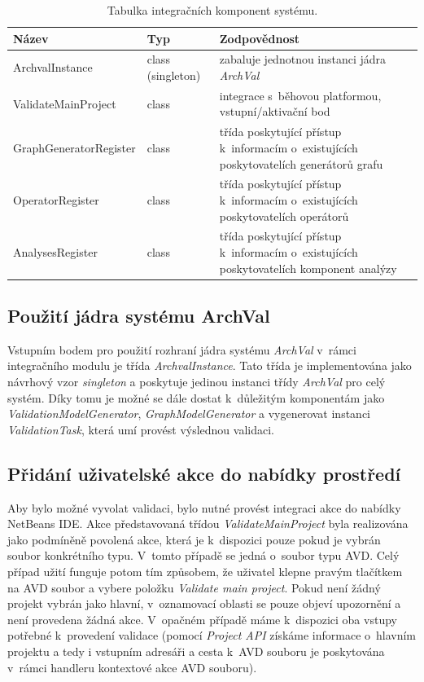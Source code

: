 \begin{table}
  \caption{Tabulka integračních komponent systému. \label{implementation-integration_components}}
  \begin{center}
    \begin{tabular}{ | l | l | p{8cm} | }
      \hline
      \textbf{Název} & \textbf{Typ} & \textbf{Zodpovědnost} \\
      \hline
      \hline
      ArchvalInstance & class (singleton) & zabaluje jednotnou instanci jádra \emph{ArchVal} \\ \hline
      ValidateMainProject & class & integrace s~běhovou platformou, vstupní/aktivační bod \\ \hline
      GraphGeneratorRegister & class & třída poskytující přístup k~informacím o~existujících poskytovatelích generátorů grafu \\ \hline
      OperatorRegister & class & třída poskytující přístup k~informacím o~existujících poskytovatelích operátorů \\ \hline
      AnalysesRegister & class & třída poskytující přístup k~informacím o~existujících poskytovatelích komponent analýzy \\ \hline
    \end{tabular}
  \end{center}
\end{table}

\subsection{Použití jádra systému ArchVal}
Vstupním bodem pro použití rozhraní jádra systému \emph{ArchVal} v~rámci integračního modulu je třída \emph{ArchvalInstance}. Tato třída je implementována jako návrhový vzor \emph{singleton} a poskytuje jedinou instanci třídy \emph{ArchVal} pro celý systém. Díky tomu je možné se dále dostat k~důležitým komponentám jako \emph{ValidationModelGenerator}, \emph{GraphModelGenerator} a vygenerovat instanci \emph{ValidationTask}, která umí provést výslednou validaci.

\subsection{Přidání uživatelské akce do nabídky prostředí}
Aby bylo možné vyvolat validaci, bylo nutné provést integraci akce do nabídky NetBeans IDE. Akce představovaná třídou \emph{ValidateMainProject} byla realizována jako podmíněně povolená akce, která je k~dispozici pouze pokud je vybrán soubor konkrétního typu. V~tomto případě se jedná o~soubor typu AVD. Celý případ užití funguje potom tím způsobem, že uživatel klepne pravým tlačítkem na AVD soubor a vybere položku \emph{Validate main project}. Pokud není žádný projekt vybrán jako hlavní, v~oznamovací oblasti se pouze objeví upozornění a není provedena žádná akce. V~opačném případě máme k~dispozici oba vstupy potřebné k~provedení validace (pomocí \emph{Project API} získáme informace o~hlavním projektu a tedy i vstupním adresáři a cesta k~AVD souboru je poskytována v~rámci handleru kontextové akce AVD souboru).

